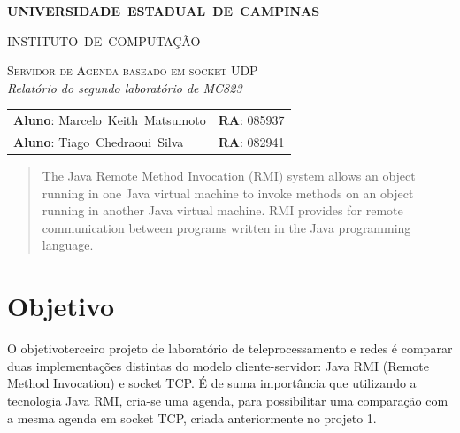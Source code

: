 \documentclass[10pt,a4paper]{article}
\begin{document}
\begin{titlepage}
  \thispagestyle{empty}
  \begin{center} {\large \textbf{UNIVERSIDADE~ESTADUAL~DE~CAMPINAS}} \end{center}
  \begin{center} {\large INSTITUTO~DE~COMPUTAÇÃO}                    \end{center}
  \vspace{0.1cm}
  \begin{center}
    \begin{minipage}[tl]{31mm}
    \end{minipage}
  \end{center}
  \vspace{0.3cm}
  \begin{center} 
    {\large \textsc{Servidor de Agenda baseado em socket UDP
      }} 
    \\\vspace{0.5cm}
    {\textsl{Relatório do segundo laboratório de MC823}}
    \\\vspace{1cm}
    \begin{tabular}{ll}
      \textbf{Aluno}:        Marcelo~Keith~Matsumoto   &  \textbf{RA}:       085937 \\
      \textbf{Aluno}:        Tiago~Chedraoui~Silva    &   \textbf{RA}:       082941 \\
      
    \end{tabular}
  \end{center}
  \vspace{0.5cm}

  \begin{abstract}

    The Java Remote Method Invocation (RMI) system allows an object running in one Java virtual machine to invoke methods on an object running in another Java virtual machine. RMI provides for remote communication between programs written in the Java programming language.

  \end{abstract}

\end{titlepage} 
\tableofcontents

\newpage


\section{Objetivo}
O objetivoterceiro projeto de laboratório de teleprocessamento e redes é
comparar duas implementações distintas do modelo cliente-servidor: Java
RMI (Remote Method Invocation) e socket TCP. 
É de suma importância que utilizando a tecnologia Java RMI, cria-se
uma agenda, para possibilitar uma comparação
com a mesma agenda em socket TCP, criada anteriormente no projeto 1.
\end{document}
